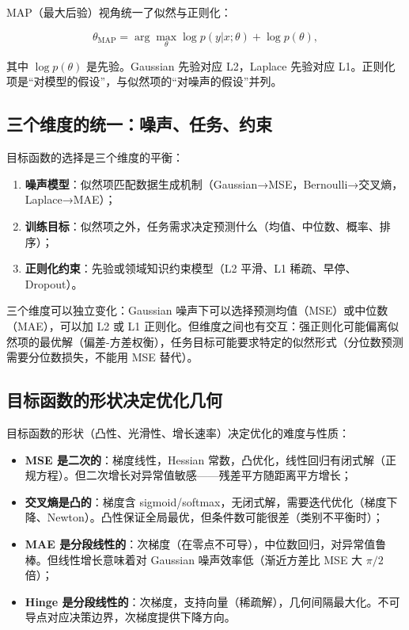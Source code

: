MAP（最大后验）视角统一了似然与正则化：

\[
\theta_{\text{MAP}}=\arg\max_\theta\log p(y|x;\theta)+\log p(\theta),
\]

其中 $\log p(\theta)$ 是先验。Gaussian 先验对应 L2，Laplace 先验对应 L1。正则化项是``对模型的假设''，与似然项的``对噪声的假设''并列。

\subsection{三个维度的统一：噪声、任务、约束}

目标函数的选择是三个维度的平衡：

\begin{enumerate}
\def\labelenumi{\arabic{enumi}.}
\tightlist
\item
  \textbf{噪声模型}：似然项匹配数据生成机制（Gaussian→MSE，Bernoulli→交叉熵，Laplace→MAE）；
\item
  \textbf{训练目标}：似然项之外，任务需求决定预测什么（均值、中位数、概率、排序）；
\item
  \textbf{正则化约束}：先验或领域知识约束模型（L2 平滑、L1 稀疏、早停、Dropout）。
\end{enumerate}

三个维度可以独立变化：Gaussian 噪声下可以选择预测均值（MSE）或中位数（MAE），可以加 L2 或 L1 正则化。但维度之间也有交互：强正则化可能偏离似然项的最优解（偏差-方差权衡），任务目标可能要求特定的似然形式（分位数预测需要分位数损失，不能用 MSE 替代）。

\subsection{目标函数的形状决定优化几何}

目标函数的形状（凸性、光滑性、增长速率）决定优化的难度与性质：

\begin{itemize}
\tightlist
\item
  \textbf{MSE 是二次的}：梯度线性，Hessian 常数，凸优化，线性回归有闭式解（正规方程）。但二次增长对异常值敏感——残差平方随距离平方增长；
\item
  \textbf{交叉熵是凸的}：梯度含 sigmoid/softmax，无闭式解，需要迭代优化（梯度下降、Newton）。凸性保证全局最优，但条件数可能很差（类别不平衡时）；
\item
  \textbf{MAE 是分段线性的}：次梯度（在零点不可导），中位数回归，对异常值鲁棒。但线性增长意味着对 Gaussian 噪声效率低（渐近方差比 MSE 大 $\pi/2$ 倍）；
\item
  \textbf{Hinge 是分段线性的}：次梯度，支持向量（稀疏解），几何间隔最大化。不可导点对应决策边界，次梯度提供下降方向。
\end{itemize}

